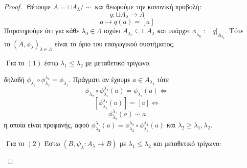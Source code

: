 \begin{proof}
    $ $\newline
    Θέτουμε $A = \sqcup A_{\lambda}\big/\sim$ και θεωρούμε την κανονική προβολή: 
    $$q: \sqcup A_{\lambda} \longrightarrow A$$
    $$a\longmapsto q(a) = [a]$$ Παρατηρούμε ότι για κάθε $\lambda_0 \in \Lambda$ ισχύει $A_{\lambda_0} \subseteq \sqcup A_{\lambda}$ και υπάρχει $\phi_{\lambda_0} := q|_{A_{\lambda_0}}$. Τότε το $(A,\phi_{\lambda})_{\lambda \in \Lambda}$ είναι το όριο του επαγωγικού συστήματος.

    $ $\newline
    Για το $(1)$ έστω $\lambda_1\leq \lambda_2$ με μεταθετικό τρίγωνο:
    
    \begin{figure}[H]
        \centering
    \end{figure}
    \noindent δηλαδή $\phi_{\lambda_2} \circ \phi^{\lambda_1}_{\lambda_2} = \phi_{\lambda_1}$. Πράγματι αν έχουμε $a \in A_{\lambda_1}$ τότε
    $$\phi_{\lambda_2} \circ \phi^{\lambda_1}_{\lambda_2} (a) = \phi_{\lambda_1}(a) \iff $$
    $$[\phi^{\lambda_1}_{\lambda_2} (a)] = [a] \iff $$
    $$\phi^{\lambda_1}_{\lambda_2}(a) \sim a$$ η οποία είναι προφανής, αφού $\phi^{\lambda_1}_{\lambda_2}(a) = \phi^{\lambda_2}_{\lambda_2} \circ \phi^{\lambda_1}_{\lambda_2}(a)$ και $\lambda_2 \geq \lambda_1,\lambda_2$.

    $ $\newline
    Για το $(2)$  Έστω $(B,\psi_{\lambda}: A_{\lambda} \rightarrow B)$ με $\lambda_1 \leq \lambda_2$ και μεταθετικό τρίγωνο:
    \begin{figure}[H]
        \centering
    \end{figure}
    

\end{proof}
